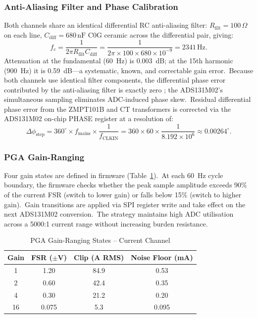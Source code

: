 \documentclass[conference]{IEEEtran}
\begin{document}
\subsubsection{Anti-Aliasing Filter and Phase Calibration}

Both channels share an identical differential RC anti-aliasing filter:
\(R_{\text{filt}} = 100\,\Omega\) on each line, \(C_{\text{diff}} =
680\,\text{nF}\) C0G ceramic across the differential pair, giving:
\begin{equation}
  f_c = \frac{1}{2\pi R_{\text{filt}} C_{\text{diff}}}
      = \frac{1}{2\pi \times 100 \times 680 \times 10^{-9}}
      = 2341\,\text{Hz}.
  \label{eq:filter_fc}
\end{equation}
Attenuation at the fundamental (60~Hz) is 0.003~dB; at the 15th
harmonic (900~Hz) it is 0.59~dB---a systematic, known, and correctable
gain error.\ Because both channels use identical filter components,
the differential phase error contributed by the anti-aliasing filter
is exactly zero \cite{ti_ads131m02_ds}; the ADS131M02's simultaneous
sampling eliminates ADC-induced phase skew.\ Residual differential
phase error from the ZMPT101B and CT transformers is corrected via the
ADS131M02 on-chip PHASE register at a resolution of:
\begin{equation}
  \Delta\phi_{\text{step}} = 360^\circ \times f_{\text{mains}}
                            \times \frac{1}{f_{\text{CLKIN}}}
                           = 360 \times 60 \times \frac{1}{8.192 \times 10^6}
                           \approx 0.00264^\circ.
  \label{eq:phase_step}
\end{equation}

\subsubsection{PGA Gain-Ranging}

Four gain states are defined in firmware (Table~\ref{tab:pga}).\ At
each 60~Hz cycle boundary, the firmware checks whether the peak sample
amplitude exceeds 90\% of the current FSR (switch to lower gain) or
falls below 15\% (switch to higher gain).\ Gain transitions are
applied via SPI register write and take effect on the next ADS131M02
conversion.\ The strategy maintains high ADC utilisation across a
5000:1 current range without increasing burden resistance.

\begin{table}[t]
  \caption{PGA Gain-Ranging States -- Current Channel}
  \label{tab:pga}
  \centering
  \begin{tabular}{cccc}
    \toprule
    Gain & FSR ($\pm$V) & Clip (A RMS) & Noise Floor (mA) \\
    \midrule
    1  & 1.20 & 84.9 & 0.53 \\
    2  & 0.60 & 42.4 & 0.35 \\
    4  & 0.30 & 21.2 & 0.20 \\
    16 & 0.075 & 5.3 & 0.095 \\
    \bottomrule
  \end{tabular}
\end{table}
\end{document}
